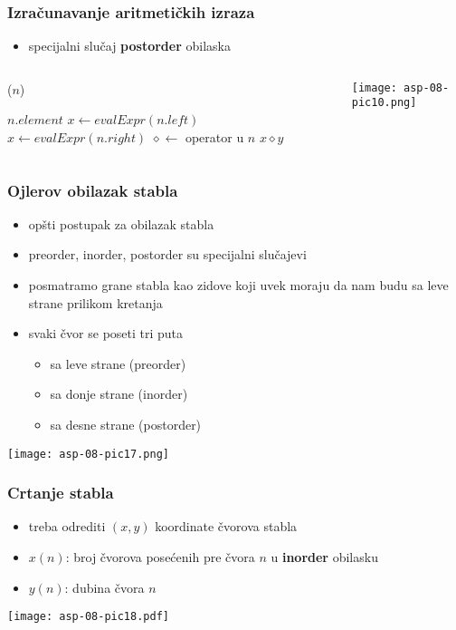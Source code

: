 \documentclass[compress]{beamer}
\begin{document}
\begin{frame}[fragile]
  \frametitle{Izračunavanje aritmetičkih izraza}
  \begin{itemize}
    \item specijalni slučaj \textbf{postorder} obilaska
  \end{itemize}
\begin{columns}
  \begin{column}[c]{5cm}
    ($n$)
    \begin{algorithmic}
      \RETURN $n$.$element$
    \ELSE
      \STATE $x \leftarrow evalExpr(n.left)$
      \STATE $x \leftarrow evalExpr(n.right)$
      \STATE $\diamond \leftarrow$ operator u $n$
      \RETURN $x \diamond y$
    \ENDIF
    \end{algorithmic}
  \end{column}
  \begin{column}[c]{6cm}
    \begin{center}
      \texttt{[image: asp-08-pic10.png]}
    \end{center}
  \end{column}
\end{columns}
\end{frame}

\begin{frame}[fragile]
  \frametitle{Ojlerov obilazak stabla}
  \begin{itemize}
    \item opšti postupak za obilazak stabla
    \item preorder, inorder, postorder su specijalni slučajevi
    \item posmatramo grane stabla kao zidove koji uvek moraju da nam budu sa leve strane prilikom kretanja
    \item svaki čvor se poseti tri puta
    \begin{itemize}
      \item sa leve strane (preorder)
      \item sa donje strane (inorder)
      \item sa desne strane (postorder)
    \end{itemize}
  \end{itemize}
  \begin{center}
    \texttt{[image: asp-08-pic17.png]}
  \end{center}
\end{frame}

\begin{frame}[fragile]
  \frametitle{Crtanje stabla}
  \begin{itemize}
    \item treba odrediti $(x,y)$ koordinate čvorova stabla
    \item $x(n)$: broj čvorova posećenih pre čvora $n$ u \textbf{inorder} obilasku
    \item $y(n)$: dubina čvora $n$
  \end{itemize}
  \begin{center}
    \texttt{[image: asp-08-pic18.pdf]}
  \end{center}
\end{frame}
\end{document}
